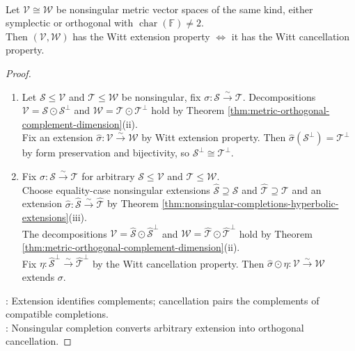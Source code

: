 \begin{proposition} \label{prop:witt-extension-cancellation-bridge} \\
Let $\mathcal{V}\cong\mathcal{W}$ be nonsingular metric vector spaces of the same kind, either symplectic or orthogonal with $\operatorname{char}(\mathbb{F})\neq2$.\\
Then $(\mathcal{V},\mathcal{W})$ has the Witt extension property $\Longleftrightarrow$ it has the Witt cancellation property.
\begin{proof}
\begin{enumerate}[label=\roman*.]
\setlength{\itemsep}{0pt}
\item[$(\Rightarrow)$] Let $\mathcal{S}\leq\mathcal{V}$ and $\mathcal{T}\leq\mathcal{W}$ be nonsingular, fix $\sigma:\mathcal{S}\xrightarrow{\sim}\mathcal{T}$. Decompositions $\mathcal{V}=\mathcal{S}\odot\mathcal{S}^{\perp}$ and $\mathcal{W}=\mathcal{T}\odot\mathcal{T}^{\perp}$ hold by Theorem \ref{thm:metric-orthogonal-complement-dimension}(ii).\\
Fix an extension $\widehat{\sigma}:\mathcal{V}\xrightarrow{\sim}\mathcal{W}$ by Witt extension property. Then $\widehat{\sigma}(\mathcal{S}^{\perp})=\mathcal{T}^{\perp}$ by form preservation and bijectivity, so $\mathcal{S}^{\perp}\cong\mathcal{T}^{\perp}$.
\item[$(\Leftarrow)$] Fix $\sigma:\mathcal{S}\xrightarrow{\sim}\mathcal{T}$ for arbitrary $\mathcal{S}\leq\mathcal{V}$ and $\mathcal{T}\leq\mathcal{W}$.\\
Choose equality-case nonsingular extensions $\widehat{\mathcal{S}}\supseteq\mathcal{S}$ and $\widehat{\mathcal{T}}\supseteq\mathcal{T}$ and an extension $\widehat{\sigma}:\widehat{\mathcal{S}}\xrightarrow{\sim}\widehat{\mathcal{T}}$ by Theorem \ref{thm:nonsingular-completions-hyperbolic-extensions}(iii).\\
The decompositions $\mathcal{V}=\widehat{\mathcal{S}}\odot\widehat{\mathcal{S}}^{\perp}$ and $\mathcal{W}=\widehat{\mathcal{T}}\odot\widehat{\mathcal{T}}^{\perp}$ hold by Theorem \ref{thm:metric-orthogonal-complement-dimension}(ii).\\
Fix $\eta:\widehat{\mathcal{S}}^{\perp}\xrightarrow{\sim}\widehat{\mathcal{T}}^{\perp}$ by the Witt cancellation property. Then $\widehat{\sigma}\odot\eta:\mathcal{V}\xrightarrow{\sim}\mathcal{W}$ extends $\sigma$.
\end{enumerate}
: Extension identifies complements; cancellation pairs the complements of compatible completions.\\
: Nonsingular completion converts arbitrary extension into orthogonal cancellation.
\end{proof}
\end{proposition}

